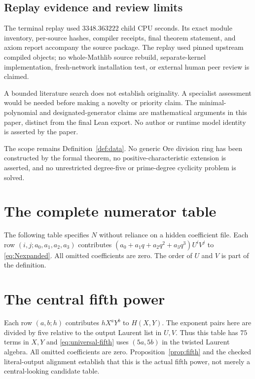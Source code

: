 \documentclass[11pt,letterpaper]{article}
\theoremstyle{definition}
\theoremstyle{remark}
\begin{document}
\subsection{Replay evidence and review limits}

The terminal replay used $3348.363222$ child CPU seconds. Its exact
module inventory, per-source hashes, compiler receipts, final theorem
statement, and axiom report accompany the source package. The replay
used pinned upstream compiled objects; no whole-Mathlib source rebuild,
separate-kernel implementation, fresh-network installation test, or
external human peer review is claimed.

A bounded literature search does not establish originality. A specialist
assessment would be needed before making a novelty or priority claim.
The minimal-polynomial and designated-generator claims are mathematical
arguments in this paper, distinct from the final Lean export. No author
or runtime model identity is asserted by the paper.

The scope remains Definition~\ref{def:data}. No generic Ore division ring
has been constructed by the formal theorem, no positive-characteristic
extension is asserted, and no unrestricted degree-five or prime-degree
cyclicity problem is solved.

\appendix
\section{The complete numerator table}\label{app:N}

The following table specifies $N$ without reliance on a hidden coefficient
file. Each row $(i,j;a_0,a_1,a_2,a_3)$ contributes
$(a_0+a_1q+a_2q^2+a_3q^3)U^iV^j$ to \eqref{eq:Nexpanded}. All omitted
coefficients are zero. The order of $U$ and $V$ is part of the definition.


\section{The central fifth power}\label{app:H}

Each row $(a,b;h)$ contributes $hX^aY^b$ to $H(X,Y)$. The exponent pairs
here are divided by five relative to the output Laurent list in
$U,V$. Thus this table has $75$ terms in $X,Y$ and
\eqref{eq:universal-fifth} uses $(5a,5b)$ in the twisted Laurent algebra.
All omitted coefficients are zero. Proposition~\ref{prop:fifth} and the
checked literal-output alignment establish that this is the actual fifth
power, not merely a central-looking candidate table.

\end{document}
